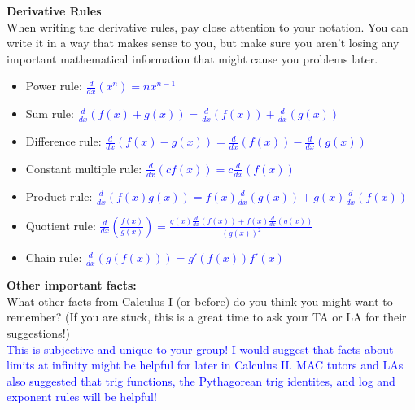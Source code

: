 \documentclass{ximera}
\begin{document}
\begin{exercise}
    \textbf{Derivative Rules} \\
    When writing the derivative rules, pay close attention to your notation.  You can write it in a way that makes sense to you, but make sure you aren't losing any important mathematical information that might cause you problems later.
    \begin{itemize}
        \item Power rule: \textcolor{blue}{$\frac{d}{dx}(x^n)=nx^{n-1}$}
        \item Sum rule: \textcolor{blue}{$\frac{d}{dx}(f(x)+g(x))=\frac{d}{dx}(f(x))+\frac{d}{dx}(g(x))$}
        \item Difference rule: \textcolor{blue}{$\frac{d}{dx}(f(x)-g(x))=\frac{d}{dx}(f(x))-\frac{d}{dx}(g(x))$}
        \item Constant multiple rule: \textcolor{blue}{$\frac{d}{dx}(cf(x))=c\frac{d}{dx}(f(x))$}
        \item Product rule: \textcolor{blue}{$\frac{d}{dx}(f(x)g(x))=f(x)\frac{d}{dx}(g(x))+g(x)\frac{d}{dx}(f(x))$}
        \item Quotient rule: \textcolor{blue}{$\frac{d}{dx}\left(\frac{f(x)}{g(x)}\right)=\frac{g(x)\frac{d}{dx}(f(x))+f(x)\frac{d}{dx}(g(x))}{(g(x))^2}$}
        \item Chain rule: \textcolor{blue}{$\frac{d}{dx}(g(f(x)))=g'(f(x))f'(x)$}
    \end{itemize}
\end{exercise}

\begin{exercise}
    \textbf{Other important facts:}\\
    What other facts from Calculus I (or before) do you think you might want to remember?  (If you are stuck, this is a great time to ask your TA or LA for their suggestions!)\\
    \textcolor{blue}{This is subjective and unique to your group!  I would suggest that facts about limits at infinity might be helpful for later in Calculus II. MAC tutors and LAs also suggested that trig functions, the Pythagorean trig identites, and log and exponent rules will be helpful!}
\end{exercise}
\end{document}
